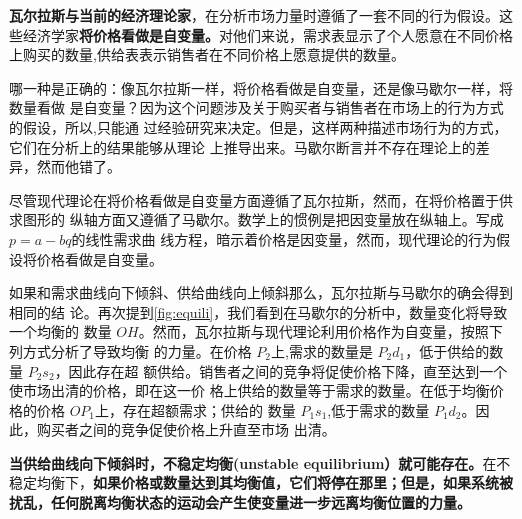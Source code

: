\textbf{瓦尔拉斯与当前的经济理论家}，在分析市场力量时遵循了一套不同的行为假设。这
些经济学家\textbf{将价格看做是自变量。}对他们来说，需求表显示了个人愿意在不同价格
上购买的数量,供给表表示销售者在不同价格上愿意提供的数量。

哪一种是正确的：像瓦尔拉斯一样，将价格看做是自变量，还是像马歇尔一样，将数量看做
是自变量？因为这个问题涉及关于购买者与销售者在市场上的行为方式的假设，所以,只能通
过经验研究来决定。但是，这样两种描述市场行为的方式，它们在分析上的结果能够从理论
上推导出来。马歇尔断言并不存在理论上的差异，然而他错了。

尽管现代理论在将价格看做是自变量方面遵循了瓦尔拉斯，然而，在将价格置于供求图形的
纵轴方面又遵循了马歇尔。数学上的惯例是把因变量放在纵轴上。写成 $p=a-bq$的线性需求曲
线方程，暗示着价格是因变量，然而，现代理论的行为假设将价格看做是自变量。

如果和需求曲线向下倾斜、供给曲线向上倾斜那么，瓦尔拉斯与马歇尔的确会得到相同的结
论。再次提到\cref{fig:equili}，我们看到在马歇尔的分析中，数量变化将导致一个均衡的
数量 $OH$。然而，瓦尔拉斯与现代理论利用价格作为自变量，按照下列方式分析了导致均衡
的力量。在价格 $P_2$上,需求的数量是 $P_2d_1$，低于供给的数量 $P_2s_2$，因此存在超
额供给。销售者之间的竞争将促使价格下降，直至达到一个使市场出清的价格，即在这一价
格上供给的数量等于需求的数量。在低于均衡价格的价格 $OP_1$上，存在超额需求；供给的
数量 $P_1s_1$,低于需求的数量 $P_1d_2$。因此，购买者之间的竞争促使价格上升直至市场
出清。

\textbf{当供给曲线向下倾斜时，不稳定均衡(unstable equilibrium）就可能存在。}在不
稳定均衡下，\textbf{如果价格或数量达到其均衡值，它们将停在那里；但是，如果系统被
  扰乱，任何脱离均衡状态的运动会产生使变量进一步远离均衡位置的力量。}

